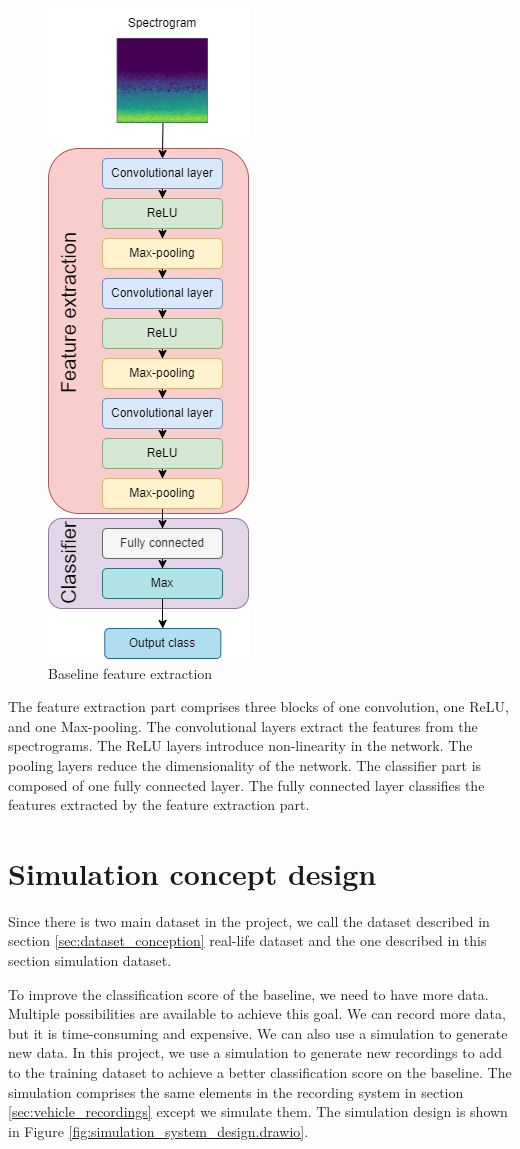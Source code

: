 \begin{figure}[H]
    \centering
    \includegraphics[width=.25\textwidth]{../Images/cnn_architecture_design.drawio.png}
    \caption{Baseline feature extraction}
    \label{fig:baseline_feature_extraction}
\end{figure}

The feature extraction part comprises three blocks of one convolution, one ReLU, and one Max-pooling. The convolutional layers extract the features from the spectrograms. The ReLU layers introduce non-linearity in the network. The pooling layers reduce the dimensionality of the network. The classifier part is composed of one fully connected layer. The fully connected layer classifies the features extracted by the feature extraction part. 

\section{Simulation concept design}
\label{sec:simulation_concept_design}

Since there is two main dataset in the project, we call the dataset described in section \ref{sec:dataset_conception} real-life dataset and the one described in this section simulation dataset. 

To improve the classification score of the baseline, we need to have more data. Multiple possibilities are available to achieve this goal. We can record more data, but it is time-consuming and expensive. We can also use a simulation to generate new data. In this project, we use a simulation to generate new recordings to add to the training dataset to achieve a better classification score on the baseline. The simulation comprises the same elements in the recording system in section \ref{sec:vehicle_recordings} except we simulate them. The simulation design is shown in Figure \ref{fig:simulation_system_design.drawio}.

